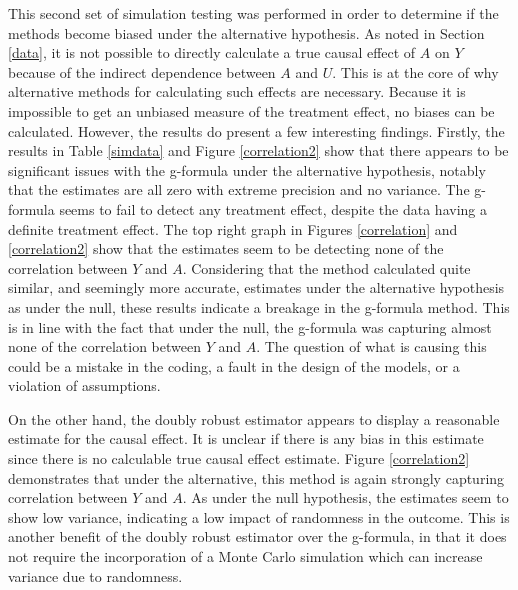 This second set of simulation testing was performed in order to determine if the methods become biased under the alternative hypothesis.  As noted in Section \ref{data}, it is not possible to directly calculate a true causal effect of $A$ on $Y$ because of the indirect dependence between $A$ and $U$.  This is at the core of why alternative methods for calculating such effects are necessary.  Because it is impossible to get an unbiased measure of the treatment effect, no biases can be calculated.  However, the results do present a few interesting findings.  Firstly, the results in Table \ref{simdata} and Figure \ref{correlation2} show that there appears to be significant issues with the g-formula under the alternative hypothesis, notably that the estimates are all zero with extreme precision and no variance.  The g-formula seems to fail to detect any treatment effect, despite the data having a definite treatment effect.  The top right graph in Figures \ref{correlation} and \ref{correlation2} show that the estimates seem to be detecting none of the correlation between $Y$ and $A$.  Considering that the method calculated quite similar, and seemingly more accurate, estimates under the alternative hypothesis as under the null, these results indicate a breakage in the g-formula method.  This is in line with the fact that under the null, the g-formula was capturing almost none of the correlation between $Y$ and $A$.  The question of what is causing this could be a mistake in the coding, a fault in the design of the models, or a violation of assumptions.

On the other hand, the doubly robust estimator appears to display a reasonable estimate for the causal effect.  It is unclear if there is any bias in this estimate since there is no calculable true causal effect estimate.  Figure \ref{correlation2} demonstrates that under the alternative, this method is again strongly capturing correlation between $Y$ and $A$.  As under the null hypothesis, the estimates seem to show low variance, indicating a low impact of randomness in the outcome.  This is another benefit of the doubly robust estimator over the g-formula, in that it does not require the incorporation of a Monte Carlo simulation which can increase variance due to randomness.  


